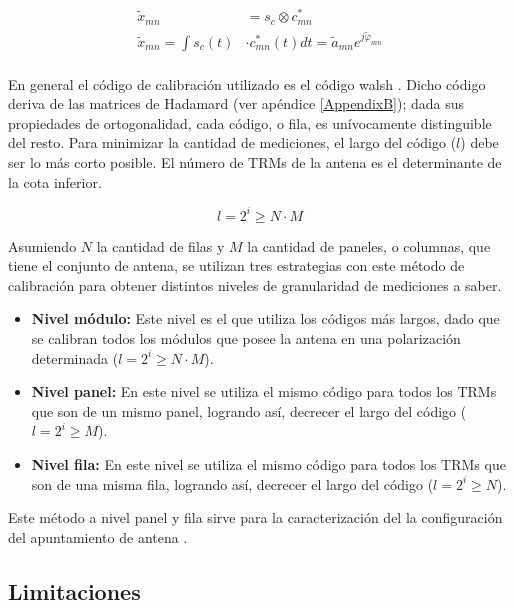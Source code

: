 \begin{equation}
\begin{aligned}
	\tilde{x}_{mn} &= s_c \otimes c^*_{mn} \\
	\tilde{x}_{mn} = \int s_c(t) &\cdot c^*_{mn}(t) dt = \tilde{a}_{mn}e^{j\tilde{\varphi}_{mn}} \\
\end{aligned}
\label{eq:classic_correlation}
\end{equation}

En general el código de calibración utilizado es el código walsh \cite{WalshCode}. Dicho código deriva de las matrices de 
Hadamard (ver apéndice \ref{AppendixB}); dada sus propiedades de ortogonalidad, cada código, o fila, es unívocamente 
distinguible del resto. Para minimizar la cantidad de mediciones, el largo del código ($l$) debe ser lo más corto posible. 
El número de TRMs de la antena es el determinante de la cota inferior.

\begin{equation}
	l = 2^i \ge N \cdot M
\end{equation}

Asumiendo $N$ la cantidad de filas y $M$ la cantidad de paneles, o columnas, que tiene el conjunto de antena, se utilizan tres
estrategias con este método de calibración para obtener distintos niveles de granularidad de mediciones a saber.

\begin{itemize}
	\item \textbf{Nivel módulo:} Este nivel es el que utiliza los códigos más largos, dado que se calibran todos los módulos que
		posee la antena en una polarización determinada ($l = 2^i \ge N \cdot M$).
	\item \textbf{Nivel panel:} En este nivel se utiliza el mismo código para todos los TRMs que son de un mismo panel,
		logrando así, decrecer el largo del código ($l = 2^i \ge M$).
	\item \textbf{Nivel fila:} En este nivel se utiliza el mismo código para todos los TRMs que son de una misma fila,
		logrando así, decrecer el largo del código ($l = 2^i \ge N$).
\end{itemize}

Este método a nivel panel y fila sirve para la caracterización del la configuración del apuntamiento de antena \cite{Br2007}.


\subsection{Limitaciones}

